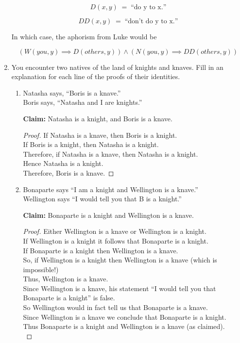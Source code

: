 \begin{enumerate}
{\[ D(x,y)  \; = \; \mbox{``do y to x.''} \]

\[ DD(x,y)  \; = \; \mbox{``don't do y to x.''} \]

In which case, the aphorism from Luke would be

\[ (W(you, y) \implies  D(others, y)) \land (N(you, y) \implies DD(others, y)) \]

}

\workbookpagebreak
\textbookpagebreak

\item You encounter two natives of the land of knights and knaves. Fill
in an explanation for each line of the proofs of their identities. 

\begin{enumerate}
\item Natasha says, ``Boris is a knave.'' \\
Boris says, ``Natasha and I are knights.''\\

\hintspagebreak

\textbf{Claim:} Natasha is a knight, and Boris is a knave.\\

\begin{proof} If Natasha is a knave, then Boris is a knight.\\
If Boris is a knight, then Natasha is a knight.\\
Therefore, if Natasha is a knave, then Natasha is a knight.\\
Hence Natasha is a knight.\\
Therefore, Boris is a knave.
\end{proof}

\item Bonaparte says ``I am a knight and Wellington is a knave.''\\
Wellington says ``I would tell you that B is a knight.''

\textbf{Claim:} Bonaparte is a knight and Wellington is a knave.

\begin{proof}
    Either Wellington is a knave or Wellington is a knight.\\
    If Wellington is a knight it follows that Bonaparte is a knight.\\
    If Bonaparte is a knight then Wellington is a knave. \\
    So, if Wellington is a knight then Wellington is a knave (which is impossible!)\\
    Thus, Wellington is a knave.\\
    Since Wellington is a knave, his statement ``I would tell you that Bonaparte is a knight'' is false. \\
    So Wellington would in fact tell us that Bonaparte is a knave. \\
    Since Wellington is a knave we conclude that Bonaparte is a knight.\\
    Thus Bonaparte is a knight and Wellington is a knave (as claimed).\\
\end{proof}


\end{enumerate}
\end{enumerate}
